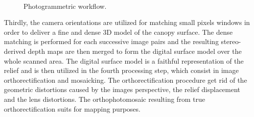 \documentclass[remotesensing,article,submit,moreauthors,pdftex,12pt,a4paper]{mdpi} %
\begin{document}
\begin{figure}
\centering
\captionsetup[subfigure]{labelformat=empty}
\hspace{0.01mm}\\
\hspace{0.01mm}
\hspace{0.01mm}
\hspace{0.01mm}
\caption{Photogrammetric workflow.}
\label{fig:workflow}
\end{figure}

Thirdly, the camera orientations are utilized for matching small pixels windows in order to deliver a fine and dense 3D model of the canopy surface. 
The dense matching is performed for each successive image pairs and the resulting stereo-derived depth maps are then merged to form the digital surface model over the whole scanned area. 
The digital surface model is a faithful representation of the relief and is then utilized in the fourth processing step, which consist in image orthorectification and mosaicking. 
The orthorectification procedure get rid of the geometric distortions caused by the images perspective, the relief displacement and the lens distortions. 
The orthophotomosaic resulting from true orthorectification suits for mapping purposes.
\end{document}
